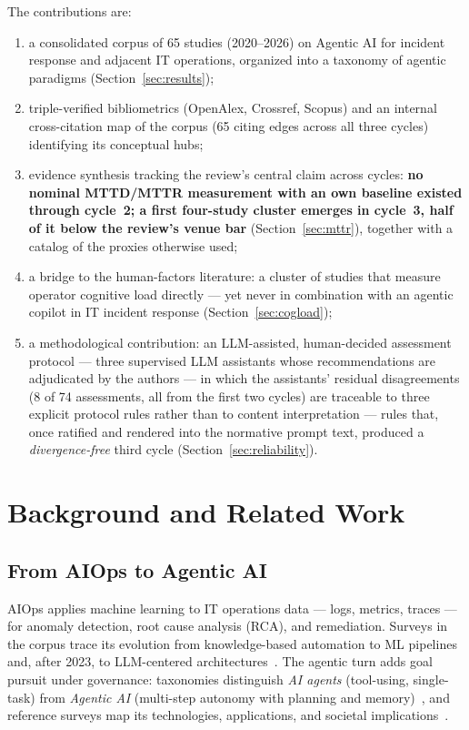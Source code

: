 \documentclass{ieeeaccess}
\begin{document}
The contributions are:
\begin{enumerate}
  \item a consolidated corpus of 65 studies (2020--2026) on Agentic AI
        for incident response and adjacent IT operations, organized into
        a taxonomy of agentic paradigms (Section~\ref{sec:results});
  \item triple-verified bibliometrics (OpenAlex, Crossref, Scopus) and an
        internal cross-citation map of the corpus (65 citing edges across
        all three cycles) identifying its conceptual hubs;
  \item evidence synthesis tracking the review's central claim across
        cycles: \textbf{no nominal MTTD/MTTR measurement with an own
        baseline existed through cycle~2; a first four-study cluster
        emerges in cycle~3, half of it below the review's venue bar}
        (Section~\ref{sec:mttr}), together with a catalog of the proxies
        otherwise used;
  \item a bridge to the human-factors literature: a cluster of studies
        that measure operator cognitive load directly --- yet never in
        combination with an agentic copilot in IT incident response
        (Section~\ref{sec:cogload});
  \item a methodological contribution: an LLM-assisted, human-decided
        assessment protocol --- three supervised LLM assistants whose
        recommendations are adjudicated by the authors --- in which the
        assistants' residual disagreements (8 of 74 assessments, all
        from the first two cycles) are traceable to three explicit
        protocol rules rather than to content interpretation --- rules
        that, once ratified and rendered into the normative prompt text,
        produced a \emph{divergence-free} third cycle
        (Section~\ref{sec:reliability}).
\end{enumerate}

\section{Background and Related Work}
\label{sec:background}

\subsection{From AIOps to Agentic AI}
AIOps applies machine learning to IT operations data --- logs, metrics,
traces --- for anomaly detection, root cause analysis (RCA), and
remediation. Surveys in the corpus trace its evolution from
knowledge-based automation to ML pipelines~\cite{P16} and, after 2023,
to LLM-centered architectures~\cite{P05}. The agentic turn adds goal
pursuit under governance: taxonomies distinguish \emph{AI agents}
(tool-using, single-task) from \emph{Agentic AI} (multi-step autonomy
with planning and memory)~\cite{P09}, and reference surveys map its
technologies, applications, and societal implications~\cite{P10,P15,P54}.
\end{document}
